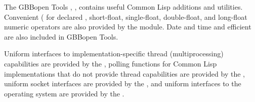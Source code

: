 \documentclass[10pt,twoside,english,pdftex]{article}
\begin{document}
%
%
%
The GBBopen Tools , , contains useful
Common Lisp additions and utilities.  Convenient ( for declared , short-float,
single-float, double-float, and long-float numeric operators are also provided
by the  module.  Date and time  and efficient
 are also included in
GBBopen Tools.

Uniform interfaces to implementation-specific thread (multiprocessing)
capabilities are provided by the , polling functions for Common Lisp
implementations that do not provide thread capabilities are
provided by the , uniform socket interfaces are
provided by the , and uniform interfaces to the operating
system are provided by the .
\end{document}
